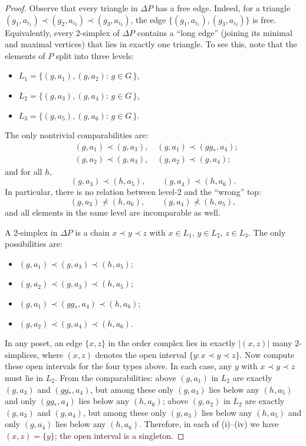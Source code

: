 \documentclass[preprint,12pt]{article}
\theoremstyle{definition}
\theoremstyle{remark}
\numberwithin{equation}{section}
\begin{document}
\begin{proof}
Observe that every triangle in $\Delta P$ has a free edge. Indeed, for a triangle $(g_1, a_{i_1}) \prec (g_2, a_{i_2}) \prec (g_3, a_{i_3})$, the edge $\{(g_1, a_{i_1}), (g_3, a_{i_3})\}$ is free. Equivalently, every 2-simplex of $\Delta P$ contains a ``long edge'' (joining its minimal and maximal vertices) that lies in exactly one triangle. To see this, note that the elements of $P$ split into three levels:
\begin{itemize}
    \item \(L_1 = \{(g, a_1), (g, a_2):\, g\in G\,\}\), 
    \item \(L_2 = \{(g, a_3), (g, a_4):\, g\in G\,\}\), 
    \item \(L_3 = \{(g, a_5), (g, a_6):\, g\in G\,\}\).
\end{itemize}

The only nontrivial comparabilities are:
\begin{align*}
& (g, a_1) \prec (g, a_3), \quad (g, a_1) \prec (gg_*, a_4);\\
& (g, a_2) \prec (g, a_3), \quad (g, a_2) \prec (g, a_4);
\end{align*}
and for all $h$,
\[
(g, a_3) \prec (h, a_5), \qquad (g, a_4) \prec (h, a_6).
\]
In particular, there is no relation between level-2 and the ``wrong'' top:
\[
(g, a_3) \not\prec (h, a_6), \qquad (g, a_4) \not\prec (h, a_5),
\]
and all elements in the same level are incomparable as well.



A 2-simplex in \(\Delta P\) is a chain \(x\prec y\prec z\) with \(x\in L_1\), \(y\in L_2\), \(z\in L_3\).
The only possibilities are:
\begin{itemize}
    \item [(i)] \((g, a_1) \prec (g, a_3) \prec (h, a_5)\);
    \item [(ii)] \((g, a_2) \prec (g, a_3) \prec (h, a_5)\);
    \item [(iii)] \((g, a_1) \prec (gg_*, a_4) \prec (h, a_6)\);
    \item [(iv)] \((g, a_2) \prec (g, a_4) \prec (h, a_6)\).
\end{itemize}

In any poset, an edge \(\{x,z\}\) in the order complex lies in exactly \(|(x,z)|\) many 2-simplices, where \((x,z)\) denotes the open interval \(\{y : x\prec y\prec z\}\). Now compute these open intervals for the four types above. In each case, any \(y\) with \(x\prec y\prec z\) must lie in \(L_2\).
From the comparabilities: above \((g, a_1)\) in \(L_2\) are exactly \((g, a_3)\) and \((gg_*, a_4)\), but among these only \((g, a_3)\) lies below any \((h, a_5)\) and only \((gg_*, a_4)\) lies below any \((h, a_6)\); above \((g, a_2)\) in \(L_2\) are exactly \((g, a_3)\) and \((g, a_4)\), but among these only \((g, a_3)\) lies below any \((h, a_5)\) and only \((g, a_4)\) lies below any \((h, a_6)\).
Therefore, in each of (i)–(iv) we have \((x,z) = \{y\}\); the open interval is a singleton. 


\end{proof}
\end{document}
